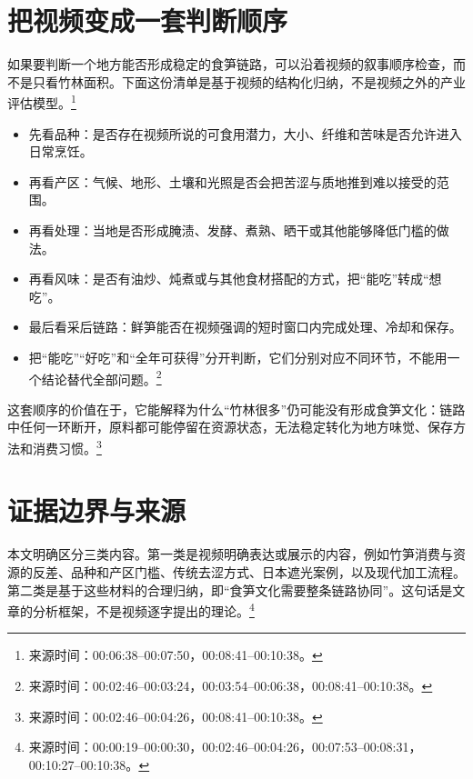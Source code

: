 \documentclass[UTF8,a4paper]{ctexart}
\begin{document}
\par\vspace{0.9\baselineskip}\pagebreak[2]
\section{把视频变成一套判断顺序}

如果要判断一个地方能否形成稳定的食笋链路，可以沿着视频的叙事顺序检查，而不是只看竹林面积。下面这份清单是基于视频的结构化归纳，不是视频之外的产业评估模型。\footnote{来源时间：00:06:38--00:07:50，00:08:41--00:10:38。}

\begin{itemize}
\setlength{\itemsep}{0.18em}\setlength{\parskip}{0.12em}
\item 先看品种：是否存在视频所说的可食用潜力，大小、纤维和苦味是否允许进入日常烹饪。
\item 再看产区：气候、地形、土壤和光照是否会把苦涩与质地推到难以接受的范围。
\item 再看处理：当地是否形成腌渍、发酵、煮熟、晒干或其他能够降低门槛的做法。
\item 再看风味：是否有油炒、炖煮或与其他食材搭配的方式，把“能吃”转成“想吃”。
\item 最后看采后链路：鲜笋能否在视频强调的短时窗口内完成处理、冷却和保存。
\item 把“能吃”“好吃”和“全年可获得”分开判断，它们分别对应不同环节，不能用一个结论替代全部问题。\footnote{来源时间：00:02:46--00:03:24，00:03:54--00:06:38，00:08:41--00:10:38。}
\end{itemize}

这套顺序的价值在于，它能解释为什么“竹林很多”仍可能没有形成食笋文化：链路中任何一环断开，原料都可能停留在资源状态，无法稳定转化为地方味觉、保存方法和消费习惯。\footnote{来源时间：00:02:46--00:04:26，00:08:41--00:10:38。}

\par\vspace{0.9\baselineskip}\pagebreak[2]
\section{证据边界与来源}

本文明确区分三类内容。第一类是视频明确表达或展示的内容，例如竹笋消费与资源的反差、品种和产区门槛、传统去涩方式、日本遮光案例，以及现代加工流程。第二类是基于这些材料的合理归纳，即“食笋文化需要整条链路协同”。这句话是文章的分析框架，不是视频逐字提出的理论。\footnote{来源时间：00:00:19--00:00:30，00:02:46--00:04:26，00:07:53--00:08:31，00:10:27--00:10:38。}
\end{document}
